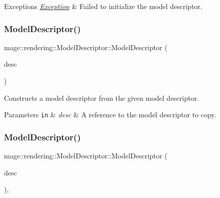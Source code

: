 \begin{DoxyExceptions}{Exceptions}
{\em \mbox{\hyperlink{classmage_1_1_exception}{Exception}}} & Failed to initialize the model descriptor. \\
\hline
\end{DoxyExceptions}
\mbox{\label{classmage_1_1rendering_1_1_model_descriptor_af3fc0dea0060aa15a8003a7f4f807dd0}} 
\subsubsection{\texorpdfstring{Model\+Descriptor()}{ModelDescriptor()}\hspace{0.1cm}{\footnotesize\ttfamily [2/3]}}
{\footnotesize\ttfamily mage\+::rendering\+::\+Model\+Descriptor\+::\+Model\+Descriptor (\begin{DoxyParamCaption}\item[{const \mbox{\hyperlink{classmage_1_1rendering_1_1_model_descriptor}{Model\+Descriptor}} \&}]{desc }\end{DoxyParamCaption})\hspace{0.3cm}{\ttfamily [delete]}}

Constructs a model descriptor from the given model descriptor.


\begin{DoxyParams}[1]{Parameters}
\mbox{\tt in}  & {\em desc} & A reference to the model descriptor to copy. \\
\hline
\end{DoxyParams}
\mbox{\label{classmage_1_1rendering_1_1_model_descriptor_a0e7a576be083c9499a074cfd39acbcb7}} 
\subsubsection{\texorpdfstring{Model\+Descriptor()}{ModelDescriptor()}\hspace{0.1cm}{\footnotesize\ttfamily [3/3]}}
{\footnotesize\ttfamily mage\+::rendering\+::\+Model\+Descriptor\+::\+Model\+Descriptor (\begin{DoxyParamCaption}\item[{\mbox{\hyperlink{classmage_1_1rendering_1_1_model_descriptor}{Model\+Descriptor}} \&\&}]{desc }\end{DoxyParamCaption})\hspace{0.3cm}{\ttfamily [default]}, {\ttfamily [noexcept]}}

